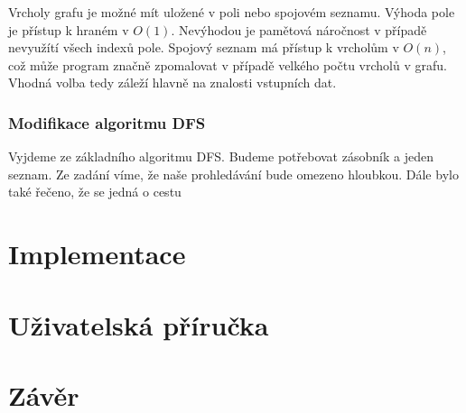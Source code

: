 Vrcholy grafu je možné mít uložené v poli nebo spojovém seznamu. Výhoda pole je přístup k hraném v $O(1)$. Nevýhodou je pamětová náročnost v případě nevyužítí všech indexů pole. Spojový seznam má přístup k vrcholům v $O(n)$, což může program značně zpomalovat v případě velkého počtu vrcholů v grafu. Vhodná volba tedy záleží hlavně na znalosti vstupních dat.

\subsection{Modifikace algoritmu DFS}
Vyjdeme ze základního algoritmu DFS. Budeme potřebovat zásobník a jeden seznam. Ze zadání víme, že naše prohledávání bude omezeno hloubkou. Dále bylo také řečeno, že se jedná o cestu 


\chapter{Implementace}

\chapter{Uživatelská příručka}

\chapter{Závěr}

